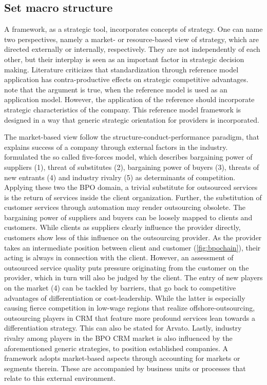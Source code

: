 	
	
	\subsection{Set macro structure}
	
	A framework, as a strategic tool, incorporates concepts of strategy. One can name two perspectives, namely a market- or resource-based view of strategy, which are directed externally or internally, respectively. They are not independently of each other, but their interplay is seen as an important factor in strategic decision making. Literature criticizes that standardization through reference model application has contra-productive effects on strategic competitive advantages. \cite{becker2004handelsinformationssysteme} note that the argument is true, when the reference model is used as an application model. However, the application of the reference should incorporate strategic characteristics of the company. This reference model framework is designed in a way that generic strategic orientation for providers is incorporated. 
	
	The market-based view follow the structure-conduct-performance paradigm, that explains success of a company through external factors in the industry. \cite{porter1980} formulated the so called five-forces model, which describes bargaining power of suppliers (1), threat of substitutes (2), bargaining power of buyers (3), threats of new entrants (4) and industry rivalry (5) as determinants of competition. Applying these two the BPO domain, a trivial substitute for outsourced services is the return of services inside the client organization. Further, the substitution of customer services through automation may render outsourcing obsolete. The bargaining power of suppliers and buyers can be loosely mapped to clients and customers. While clients as suppliers clearly influence the provider directly, customers show less of this influence on the outsourcing provider. As the provider takes an intermediate position between client and customer (\cf \Fig \ref{fig:bpochain}), their acting is always in connection with the client. However, an assessment of outsourced service quality puts pressure originating from the customer on the provider, which in turn will also be judged by the client. The entry of new players on the market (4) can be tackled by barriers, that go back to competitive advantages of differentiation or cost-leadership. While the latter is especially causing fierce competition in low-wage regions that realize offshore-outsourcing, outsourcing players in CRM that feature more profound services lean towards a differentiation strategy. This can also be stated for Arvato. Lastly, industry rivalry among players in the BPO CRM market is also influenced by the aforementioned generic strategies, to position established companies. A framework adopts market-based aspects through accounting for markets or segments therein. These are accompanied by business units or processes that relate to this external environment. 
	
